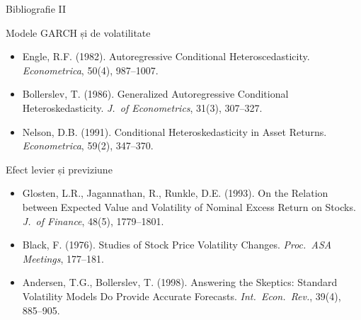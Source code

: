 \documentclass[9pt, aspectratio=169, t]{beamer}
\theoremstyle{definition}
\newenvironment{cminipage}[1]{%
    \par\noindent\hfill\begin{minipage}{#1}\ignorespaces
}{%
    \end{minipage}\hfill\null\par
}
\begin{document}
\begin{frame}{Bibliografie II}
    \vspace{-0.3cm}
    \begin{cminipage}{0.95\textwidth}
    \begin{block}{Modele GARCH și de volatilitate}
        {\small
        \begin{itemize}\setlength{\itemsep}{0pt}
            \item Engle, R.F. (1982). Autoregressive Conditional Heteroscedasticity. \textit{Econometrica}, 50(4), 987--1007.
            \item Bollerslev, T. (1986). Generalized Autoregressive Conditional Heteroskedasticity. \textit{J.\ of Econometrics}, 31(3), 307--327.
            \item Nelson, D.B. (1991). Conditional Heteroskedasticity in Asset Returns. \textit{Econometrica}, 59(2), 347--370.
        \end{itemize}
        }
    \end{block}

    \begin{exampleblock}{Efect levier și previziune}
        {\small
        \begin{itemize}\setlength{\itemsep}{0pt}
            \item Glosten, L.R., Jagannathan, R., Runkle, D.E. (1993). On the Relation between Expected Value and Volatility of Nominal Excess Return on Stocks. \textit{J.\ of Finance}, 48(5), 1779--1801.
            \item Black, F. (1976). Studies of Stock Price Volatility Changes. \textit{Proc.\ ASA Meetings}, 177--181.
            \item Andersen, T.G., Bollerslev, T. (1998). Answering the Skeptics: Standard Volatility Models Do Provide Accurate Forecasts. \textit{Int.\ Econ.\ Rev.}, 39(4), 885--905.
        \end{itemize}
        }
    \end{exampleblock}
    \end{cminipage}
\end{frame}
\end{document}
